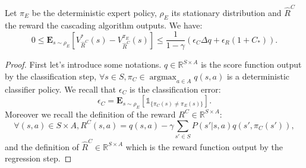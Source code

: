 \documentclass[smallextended]{svjour3}
\newcommand{\E}{\mathbf{E}}
\newcommand{\argmax}{\operatorname*{argmax}} %
\begin{document}
\begin{theorem}
\label{theorem: theorem analysis}
Let $\pi_E$ be the deterministic expert policy, $\rho_E$ its stationary distribution and $\hat{R}^C$ the reward the cascading algorithm outputs. We have:
\begin{equation}
0\leq\E_{s\sim\rho_E}[V^*_{\hat{R}^C}(s)-V^{\pi_E}_{\hat{R}^C}(s)]\leq \frac{1}{1-\gamma}\left(\epsilon_C\Delta q +\epsilon_R(1+C_*)\right).
\end{equation}
\end{theorem}
\begin{proof}
First let's introduce some notations. $q\in\mathbb{R}^{S\times A}$ is the score function output by the classification step, $\forall s \in S,\pi_C\in\argmax_{a\in A}q(s,a)$ is a deterministic classifier policy. We recall that $\epsilon_C$ is the classification error:
\begin{equation}
\epsilon_C=\E_{s\sim\rho_E}[\mathds{1}_{\{\pi_C(s)\neq\pi_E(s)\}}].
\end{equation}
Moreover we recall the definition of the reward $R^C\in\mathbb{R}^{S\times A}$:
\begin{equation}
\forall (s,a)\in S\times A, R^C(s,a)=q(s,a) -\gamma\sum_{s'\in S}P(s'|s,a)q(s',\pi_C(s')),
\end{equation}
and the definition of $\hat{R}^C\in\mathbb{R}^{S\times A}$ which is the reward function output by the regression step.


\end{proof}
\end{document}
